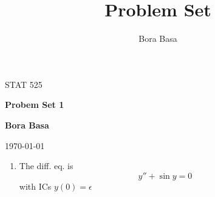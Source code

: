 \documentclass[12pt]{article}
\title{Problem Set \HWNO}
\author{Bora Basa}
\newcommand{\CLASS}{STAT 525}
\newcommand{\HWNO}{1}
\begin{document}
\begin{titlepage}
    \setlength{\parindent}{0pt}
    \vspace*{-3.8\baselineskip}
    \CLASS
    \begin{center}
    \vspace{.1\textheight}
    {\huge\bfseries Probem Set \HWNO \par}
    \bigbreak
    {\bfseries\large Bora Basa\par}
    \bigbreak
    \today
\end{center}
\end{titlepage}
\begin{enumerate}
    \item The diff. eq. is
    \begin{equation}
         y''+\sin y = 0
     \end{equation}
     with ICs $y(0)=\epsilon$
\end{enumerate}
\end{document}
